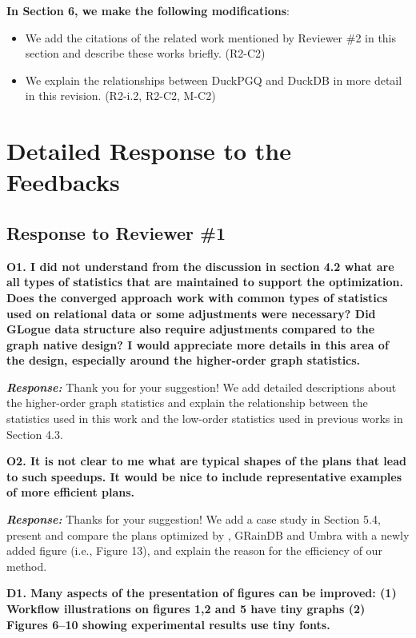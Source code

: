 \textbf{In Section 6, we make the following modifications}:
\begin{itemize}
	\item We add the citations of the related work mentioned by Reviewer \#2 in this section and describe these works briefly. (R2-C2)
	\item We explain the relationships between DuckPGQ and DuckDB in more detail in this revision. (R2-i.2, R2-C2, M-C2)
\end{itemize}


\section{Detailed Response to the Feedbacks}
\label{sec:response}
\subsection{Response to Reviewer \#1}

\textbf{O1. I did not understand from the discussion in section 4.2 what are all types of statistics that are maintained to support the optimization. Does the converged approach work with common types of statistics used on relational data or some adjustments were necessary? Did GLogue data structure also require adjustments compared to the graph native design? I would appreciate more details in this area of the design, especially around the higher-order graph statistics.}

\textbf{\textit{Response: }}
Thank you for your suggestion! We add detailed descriptions about the higher-order graph statistics and explain the relationship between the statistics used in this work and the low-order statistics used in previous works in Section 4.3.



\textbf{O2. It is not clear to me what are typical shapes of the plans that lead to such speedups. It would be nice to include representative examples of more efficient plans.}

\textbf{\textit{Response: }}
Thanks for your suggestion! We add a case study in Section 5.4, present and compare the plans optimized by \name, GRainDB and Umbra with a newly added figure (i.e., Figure 13), and explain the reason for the efficiency of our method.


\textbf{D1. Many aspects of the presentation of figures can be improved: 
(1) Workflow illustrations on figures 1,2 and 5 have tiny graphs
(2) Figures 6--10 showing experimental results use tiny fonts.}

